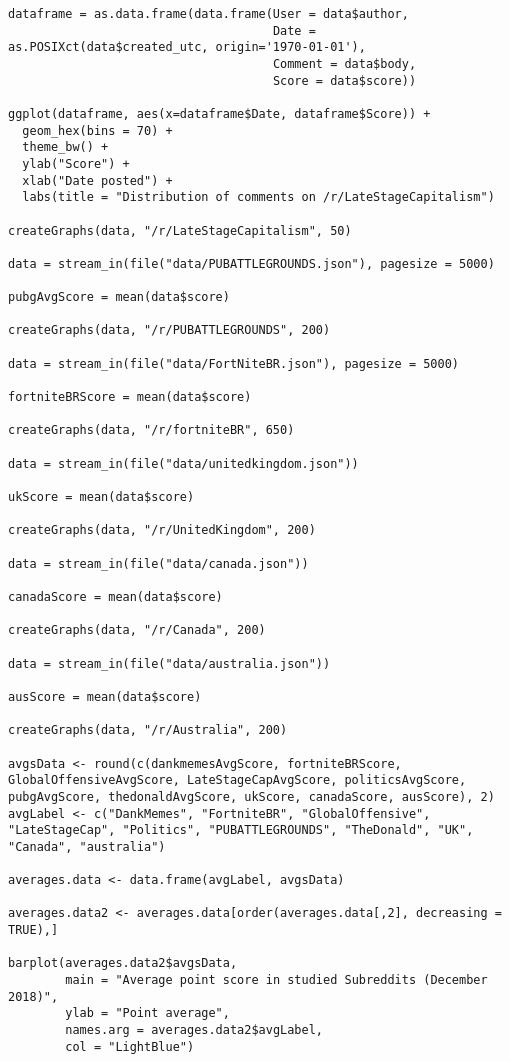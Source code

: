 \begin{lstlisting}
dataframe = as.data.frame(data.frame(User = data$author, 
                                     Date = as.POSIXct(data$created_utc, origin='1970-01-01'), 
                                     Comment = data$body,
                                     Score = data$score))

ggplot(dataframe, aes(x=dataframe$Date, dataframe$Score)) +
  geom_hex(bins = 70) +
  theme_bw() +
  ylab("Score") +
  xlab("Date posted") +
  labs(title = "Distribution of comments on /r/LateStageCapitalism")

createGraphs(data, "/r/LateStageCapitalism", 50)

data = stream_in(file("data/PUBATTLEGROUNDS.json"), pagesize = 5000)

pubgAvgScore = mean(data$score)

createGraphs(data, "/r/PUBATTLEGROUNDS", 200)

data = stream_in(file("data/FortNiteBR.json"), pagesize = 5000)

fortniteBRScore = mean(data$score)

createGraphs(data, "/r/fortniteBR", 650)

data = stream_in(file("data/unitedkingdom.json"))

ukScore = mean(data$score)

createGraphs(data, "/r/UnitedKingdom", 200)

data = stream_in(file("data/canada.json"))

canadaScore = mean(data$score)

createGraphs(data, "/r/Canada", 200)

data = stream_in(file("data/australia.json"))

ausScore = mean(data$score)

createGraphs(data, "/r/Australia", 200)

avgsData <- round(c(dankmemesAvgScore, fortniteBRScore, GlobalOffensiveAvgScore, LateStageCapAvgScore, politicsAvgScore, pubgAvgScore, thedonaldAvgScore, ukScore, canadaScore, ausScore), 2)
avgLabel <- c("DankMemes", "FortniteBR", "GlobalOffensive", "LateStageCap", "Politics", "PUBATTLEGROUNDS", "TheDonald", "UK", "Canada", "australia")

averages.data <- data.frame(avgLabel, avgsData)

averages.data2 <- averages.data[order(averages.data[,2], decreasing = TRUE),]

barplot(averages.data2$avgsData,
        main = "Average point score in studied Subreddits (December 2018)",
        ylab = "Point average",
        names.arg = averages.data2$avgLabel,
        col = "LightBlue")

\end{lstlisting}

